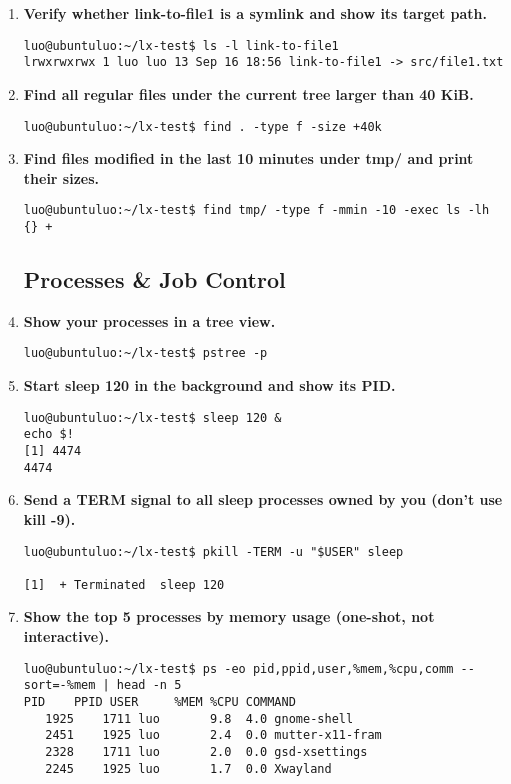 \begin{enumerate}[leftmargin=2em]
\item \textbf{Verify whether link-to-file1 is a symlink and show its target path.}
\begin{Verbatim}[formatcom=\color{blue}]
luo@ubuntuluo:~/lx-test$ ls -l link-to-file1
lrwxrwxrwx 1 luo luo 13 Sep 16 18:56 link-to-file1 -> src/file1.txt
\end{Verbatim}

\item \textbf{Find all regular files under the current tree larger than 40 KiB.}
\begin{Verbatim}[formatcom=\color{blue}]
luo@ubuntuluo:~/lx-test$ find . -type f -size +40k
\end{Verbatim}

\item \textbf{Find files modified in the last 10 minutes under tmp/ and print their sizes.}
\begin{Verbatim}[formatcom=\color{blue}]
luo@ubuntuluo:~/lx-test$ find tmp/ -type f -mmin -10 -exec ls -lh {} +
\end{Verbatim}

\subsection{Processes \& Job Control}

\item \textbf{Show your processes in a tree view.}
\begin{Verbatim}[formatcom=\color{blue}]
luo@ubuntuluo:~/lx-test$ pstree -p
\end{Verbatim}

\item \textbf{Start sleep 120 in the background and show its PID.}
\begin{Verbatim}[formatcom=\color{blue}]
luo@ubuntuluo:~/lx-test$ sleep 120 &
echo $!
[1] 4474
4474

\end{Verbatim}

\item \textbf{Send a TERM signal to all sleep processes owned by you (don’t use kill -9).}
\begin{Verbatim}[formatcom=\color{blue}]
luo@ubuntuluo:~/lx-test$ pkill -TERM -u "$USER" sleep

[1]  + Terminated  sleep 120

\end{Verbatim}

\item \textbf{Show the top 5 processes by memory usage (one-shot, not interactive).}
\begin{Verbatim}[formatcom=\color{blue}]
luo@ubuntuluo:~/lx-test$ ps -eo pid,ppid,user,%mem,%cpu,comm --sort=-%mem | head -n 5
PID    PPID USER     %MEM %CPU COMMAND
   1925    1711 luo       9.8  4.0 gnome-shell
   2451    1925 luo       2.4  0.0 mutter-x11-fram
   2328    1711 luo       2.0  0.0 gsd-xsettings
   2245    1925 luo       1.7  0.0 Xwayland


\end{Verbatim}
\end{enumerate}
